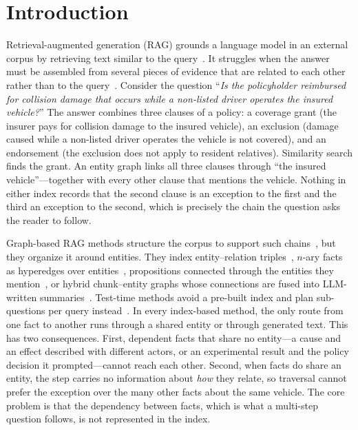 \documentclass[runningheads]{llncs}
\begin{document}
\section{Introduction}

Retrieval-augmented generation (RAG) grounds a language model in an external corpus by retrieving text similar to the query~\cite{lewis2020retrieval}. It struggles when the answer must be assembled from several pieces of evidence that are related to each other rather than to the query~\cite{yang2018hotpotqa,trivedi2022musique,trivedi2023interleaving}. Consider the question ``\emph{Is the policyholder reimbursed for collision damage that occurs while a non-listed driver operates the insured vehicle?}'' The answer combines three clauses of a policy: a coverage grant (the insurer pays for collision damage to the insured vehicle), an exclusion (damage caused while a non-listed driver operates the vehicle is not covered), and an endorsement (the exclusion does not apply to resident relatives). Similarity search finds the grant. An entity graph links all three clauses through ``the insured vehicle''---together with every other clause that mentions the vehicle. Nothing in either index records that the second clause is an exception to the first and the third an exception to the second, which is precisely the chain the question asks the reader to follow.

Graph-based RAG methods structure the corpus to support such chains~\cite{peng2025graph,han2024retrieval}, but they organize it around entities. They index entity--relation triples~\cite{edge2024local,guo2024lightrag,gutierrez2024hipporag,gutierrez2025rag,wu2026memgraphrag}, $n$-ary facts as hyperedges over entities~\cite{luo2025hypergraphrag,lien2026hyperrag}, propositions connected through the entities they mention~\cite{wang2025proprag}, or hybrid chunk--entity graphs whose connections are fused into LLM-written summaries~\cite{zhong2026hygrag}. Test-time methods avoid a pre-built index and plan sub-questions per query instead~\cite{chen2026logicrag,verma2025planrag}. In every index-based method, the only route from one fact to another runs through a shared entity or through generated text. This has two consequences. First, dependent facts that share no entity---a cause and an effect described with different actors, or an experimental result and the policy decision it prompted---cannot reach each other. Second, when facts do share an entity, the step carries no information about \emph{how} they relate, so traversal cannot prefer the exception over the many other facts about the same vehicle. The core problem is that the dependency between facts, which is what a multi-step question follows, is not represented in the index.
\end{document}
